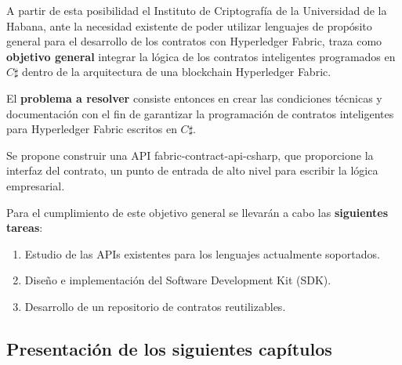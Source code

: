 
A partir de esta posibilidad el Instituto de Criptografía de la Universidad de la Habana, ante la necesidad existente de poder utilizar lenguajes de propósito general para el desarrollo de los contratos con Hyperledger Fabric, traza como    \textbf{objetivo general} integrar la lógica de los contratos inteligentes programados en $C\sharp$ dentro de la arquitectura de una blockchain Hyperledger Fabric.


El \textbf{problema a resolver} consiste entonces en crear las condiciones técnicas y documentación con el fin de garantizar la programación de contratos inteligentes para Hyperledger Fabric  escritos en $C\sharp$.

Se propone construir una API fabric-contract-api-csharp,  que proporcione la interfaz del contrato, un punto de entrada de alto nivel para escribir la lógica empresarial.

Para el cumplimiento de este objetivo general se llevarán a cabo las \textbf{siguientes tareas}:

\begin{enumerate}
\item Estudio de las APIs existentes para los lenguajes actualmente soportados.
\item Diseño e implementación del Software Development Kit (SDK).
\item Desarrollo de un repositorio de contratos reutilizables.
\end{enumerate}

\subsection*{Presentación de los siguientes capítulos}	
